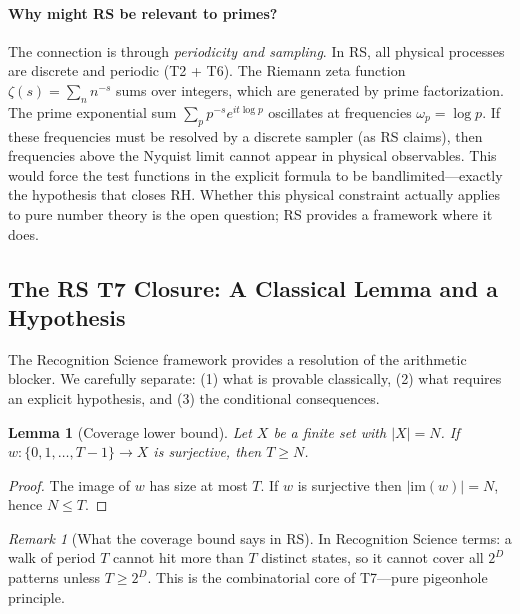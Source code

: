 \documentclass[11pt]{article}
\newtheorem{lemma}[theorem]{Lemma}
\theoremstyle{definition}
\theoremstyle{remark}
\newtheorem{remark}[theorem]{Remark}
\theoremstyle{definition}
\begin{document}
\paragraph{Why might RS be relevant to primes?}
The connection is through \emph{periodicity and sampling}. In RS, all physical processes are discrete and periodic (T2 + T6). The Riemann zeta function $\zeta(s) = \sum_n n^{-s}$ sums over integers, which are generated by prime factorization. The prime exponential sum $\sum_p p^{-s} e^{it\log p}$ oscillates at frequencies $\omega_p = \log p$. If these frequencies must be resolved by a discrete sampler (as RS claims), then frequencies above the Nyquist limit cannot appear in physical observables. This would force the test functions in the explicit formula to be bandlimited---exactly the hypothesis that closes RH. Whether this physical constraint actually applies to pure number theory is the open question; RS provides a framework where it does.

\subsection*{The RS T7 Closure: A Classical Lemma and a Hypothesis}

The Recognition Science framework provides a resolution of the arithmetic blocker. We carefully separate: (1) what is provable classically, (2) what requires an explicit hypothesis, and (3) the conditional consequences.


\begin{lemma}[Coverage lower bound]\label{lem:coverage-bound}
Let $X$ be a finite set with $|X| = N$. If $w: \{0, 1, \ldots, T-1\} \to X$ is surjective, then $T \ge N$.
\end{lemma}
\begin{proof}
The image of $w$ has size at most $T$. If $w$ is surjective then $|\mathrm{im}(w)| = N$, hence $N \le T$.
\end{proof}

\begin{remark}[What the coverage bound says in RS]\label{rem:coverage-rs}
In Recognition Science terms: a walk of period $T$ cannot hit more than $T$ distinct states, so it cannot cover all $2^D$ patterns unless $T \ge 2^D$. This is the combinatorial core of T7---pure pigeonhole principle.
\end{remark}

\end{document}
